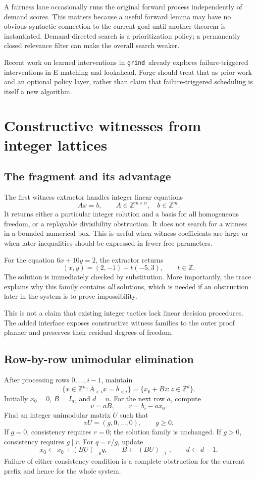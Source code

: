 \documentclass[11pt,a4paper]{article}
\newcommand{\grind}{\texttt{grind}}
\newcommand{\Z}{\mathbb{Z}}
\begin{document}
A fairness lane occasionally runs the original forward process independently of demand scores. This matters because a useful forward lemma may have no obvious syntactic connection to the current goal until another theorem is instantiated. Demand-directed search is a prioritization policy; a permanently closed relevance filter can make the overall search weaker.

Recent work on learned interventions in \grind\ already explores failure-triggered interventions in E-matching and lookahead. Forge should treat that as prior work and an optional policy layer, rather than claim that failure-triggered scheduling is itself a new algorithm.\cite{learned}

\section{Constructive witnesses from integer lattices}
\label{sec:lattice}

\subsection{The fragment and its advantage}

The first witness extractor handles integer linear equations
\[
A x=b,\qquad A\in\Z^{m\times n},\quad b\in\Z^m.
\]
It returns either a particular integer solution and a basis for all homogeneous freedom, or a replayable divisibility obstruction. It does not search for a witness in a bounded numerical box. This is useful when witness coefficients are large or when later inequalities should be expressed in fewer free parameters.

For the equation $6x+10y=2$, the extractor returns
\[
(x,y)=(2,-1)+t(-5,3),\qquad t\in\Z.
\]
The solution is immediately checked by substitution. More importantly, the trace explains why this family contains \emph{all} solutions, which is needed if an obstruction later in the system is to prove impossibility.

This is not a claim that existing integer tactics lack linear decision procedures. The added interface exposes constructive witness families to the outer proof planner and preserves their residual degrees of freedom.

\subsection{Row-by-row unimodular elimination}

After processing rows $0,\ldots,i-1$, maintain
\[
\{x\in\Z^n:A_{<i}x=b_{<i}\}
  =\{x_0+Bz:z\in\Z^d\}.
\tag{L}
\]
Initially $x_0=0$, $B=I_n$, and $d=n$. For the next row $a$, compute
\[
v=aB,\qquad r=b_i-ax_0.
\]
Find an integer unimodular matrix $U$ such that
\[
vU=(g,0,\ldots,0),\qquad g\geq0.
\]
If $g=0$, consistency requires $r=0$; the solution family is unchanged. If $g>0$, consistency requires $g\mid r$. For $q=r/g$, update
\[
x_0\leftarrow x_0+(BU)_{:,0}q,\qquad
B\leftarrow(BU)_{:,1:},\qquad d\leftarrow d-1.
\]
Failure of either consistency condition is a complete obstruction for the current prefix and hence for the whole system.
\end{document}
